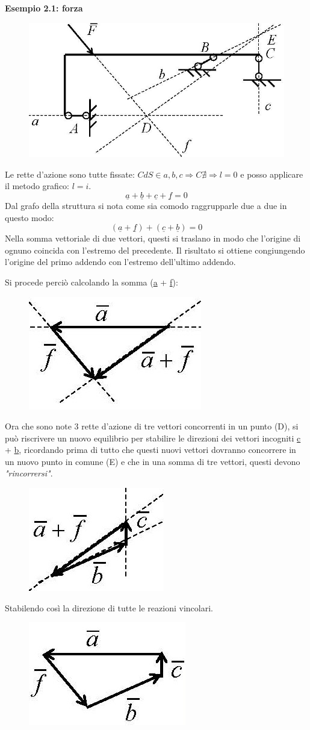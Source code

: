 \documentclass{article}
\begin{document}
\begin{adjustwidth}{2in}{}
\textbf{Esempio 2.1: forza}
\begin{figure}[H]
	\centering
	\includegraphics[width=0.4\linewidth]{immagini/1.PARTE4_Pagina_27 (2)}
\end{figure}
Le rette d’azione sono tutte fissate: \(CdS\in a,b,c \Rightarrow C\nexists \Rightarrow l = 0\) e posso applicare il metodo grafico: $l = i$.
\[
\underline{a} + \underline{b} + \underline{c} + \underline{f}= 0 
\]
Dal grafo della struttura si nota come sia comodo raggrupparle due a due in questo modo:
\[
(\underline{a} + \underline{f}) + (\underline{c} + \underline{b})= 0 
\]
Nella somma vettoriale di due vettori, questi si traslano in modo che l'origine di ognuno coincida con l'estremo del precedente. Il risultato si ottiene congiungendo l'origine del primo addendo con l'estremo dell'ultimo addendo. \newline

Si procede perciò calcolando la somma (\underline{a} + \underline{f}):
\begin{figure}[H]
	\centering
	\includegraphics[width=0.15\linewidth]{immagini/1.PARTE4_Pagina_27 (3)}
\end{figure}
Ora che sono note 3 rette d'azione di tre vettori concorrenti in un punto (D), si può riscrivere un nuovo equilibrio per stabilire le direzioni dei vettori incogniti \newline \underline{c} + \underline{b}, ricordando prima di tutto che questi nuovi vettori dovranno concorrere in un nuovo punto in comune (E) e che in una somma di tre vettori, questi devono \textit{"rincorrersi"}.
\begin{figure}[H]
	\centering
	\includegraphics[width=0.15\linewidth]{immagini/1.PARTE4_Pagina_27 (4)}
\end{figure}
Stabilendo così la direzione di tutte le reazioni vincolari. 
\begin{figure}[H]
	\centering
	\includegraphics[width=0.15\linewidth]{immagini/1.PARTE4_Pagina_27}
\end{figure} 


\end{adjustwidth}
\end{document}
